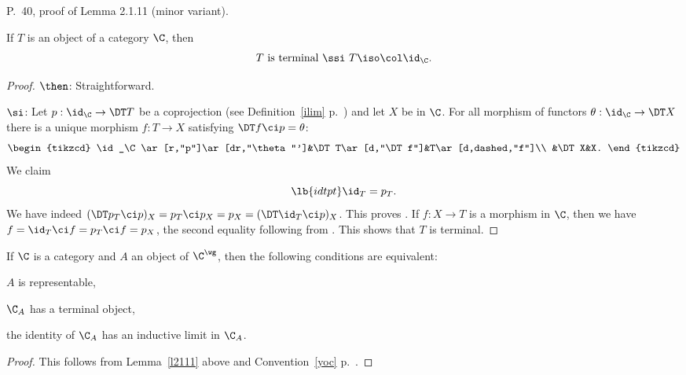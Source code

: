 \documentclass[12pt]{article}
\theoremstyle{remark}
\theoremstyle{definition}
\begin{document}
%

\begin{s} 
P.~40, proof of Lemma 2.1.11 (minor variant).

\begin{lem}
If $T$ is an object of a category $\C$, then 
$$
T\text{ is terminal }\ssi\ T\iso\col\id_\C.
$$
\end{lem}

\begin{proof} $\then$: Straightforward.

\nn$\si$: Let $p:\id_\C\to\DT T$ be a coprojection (see Definition~\ref{ilim} p.~) and let $X$ be in $\C$. For all morphism of functors $\theta:\id_\C\to\DT X$ there is a unique morphism $f:T\to X$ satisfying $\DT f\ci p=\theta$: %
$$
\begin{tikzcd}
\id_\C\ar[r,"p"]\ar[dr,"\theta"']&\DT T\ar[d,"\DT f"]&T\ar[d,dashed,"f"]\\ 
&\DT X&X.
\end{tikzcd}
$$ 
We claim 
\begin{equation}\lb{idtpt}
\id_T=p_T.
\end{equation} 
We have indeed $(\DT p_T\ci p)_X=p_T\ci p_X=p_X=(\DT\id_T\ci p)_X$. This proves . If $f:X\to T$ is a morphism in $\C$, then we have $f=\id_T\ci f=p_T\ci f=p_X$, the second equality following from . This shows that $T$ is terminal.
\end{proof}

\begin{cor}
If $\C$ is a category and $A$ an object of $\C^\wg$, then the following conditions are equivalent:

 $A$ is representable,

 $\C_A$ has a terminal object,

 the identity of $\C_A$ has an inductive limit in $\C_A$.
\end{cor}

\begin{proof}
This follows from Lemma~\ref{l2111} above and Convention~\ref{yoc} p.~.
\end{proof}
\end{s}
\end{document}
